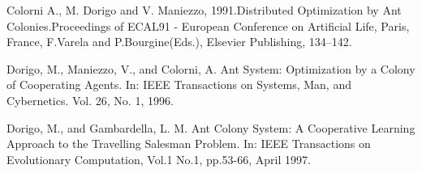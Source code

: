 \documentclass[10pt]{article}
\begin{document}


%
%
\newpage
\begin{thebibliography}{9}
 



Colorni   A.,   M.   Dorigo   and   V.   Maniezzo,   1991.Distributed   Optimization   by   Ant   Colonies.Proceedings  of  ECAL91  -  European  Conference  on Artificial Life, Paris, France, F.Varela and P.Bourgine(Eds.), Elsevier Publishing, 134–142.

Dorigo,  M.,  Maniezzo,  V.,  and  Colorni,  A.  Ant  System:  Optimization  by  a  Colony  of Cooperating Agents. In: IEEE Transactions on Systems, Man, and Cybernetics. Vol. 26, No. 1, 1996.

Dorigo,  M.,  and  Gambardella,  L.  M.  Ant  Colony  System:  A  Cooperative  Learning Approach  to  the  Travelling  Salesman  Problem.  In: IEEE  Transactions  on  Evolutionary Computation, Vol.1 No.1, pp.53-66, April 1997.


\end{thebibliography}
\end{document}
